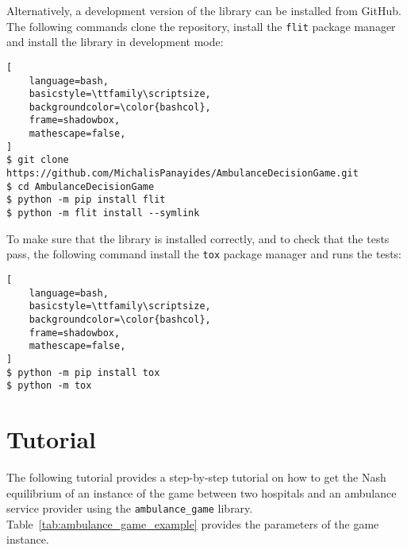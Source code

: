 Alternatively, a development version of the library can be installed from
GitHub.
The following commands clone the repository, install the \texttt{flit}
package manager and install the library in development mode: 

\begin{lstlisting}[
    language=bash,
    basicstyle=\ttfamily\scriptsize,
    backgroundcolor=\color{bashcol},
    frame=shadowbox,
    mathescape=false,
]
$ git clone https://github.com/MichalisPanayides/AmbulanceDecisionGame.git
$ cd AmbulanceDecisionGame
$ python -m pip install flit
$ python -m flit install --symlink
\end{lstlisting}

To make sure that the library is installed correctly, and to check that the
tests pass, the following command install the \texttt{tox} package manager
and runs the tests:

\begin{lstlisting}[
    language=bash,
    basicstyle=\ttfamily\scriptsize,
    backgroundcolor=\color{bashcol},
    frame=shadowbox,
    mathescape=false,
]
$ python -m pip install tox
$ python -m tox
\end{lstlisting}


\section{Tutorial}\label{sec:ambulance_game_tutorial}

The following tutorial provides a step-by-step tutorial on how to get the Nash
equilibrium of an instance of the game between two hospitals and an ambulance
service provider using the \texttt{ambulance\_game} library.
Table~\ref{tab:ambulance_game_example} provides the parameters of the game
instance.


